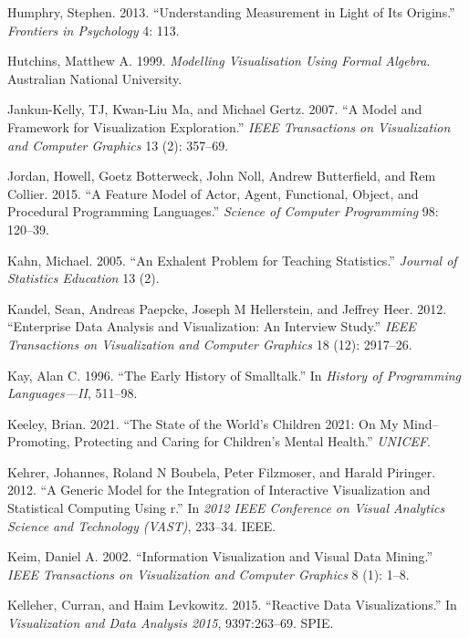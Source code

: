 \documentclass[
]{book}
\newlength{\cslhangindent}
\newenvironment{CSLReferences}[2] %
 {\begin{list}{}{%
  \setlength{\itemindent}{0pt}
  \setlength{\leftmargin}{0pt}
  \setlength{\parsep}{0pt}
  \ifodd #1
   \setlength{\leftmargin}{\cslhangindent}
   \setlength{\itemindent}{-1\cslhangindent}
  \fi
  \setlength{\itemsep}{#2\baselineskip}}}
 {\end{list}}
\theoremstyle{definition}
\theoremstyle{definition}
\theoremstyle{definition}
\theoremstyle{definition}
\theoremstyle{remark}
\begin{document}
\begin{CSLReferences}{1}{0}
Humphry, Stephen. 2013. {``Understanding Measurement in Light of Its Origins.''} \emph{Frontiers in Psychology} 4: 113.

Hutchins, Matthew A. 1999. \emph{Modelling Visualisation Using Formal Algebra}. Australian National University.

Jankun-Kelly, TJ, Kwan-Liu Ma, and Michael Gertz. 2007. {``A Model and Framework for Visualization Exploration.''} \emph{IEEE Transactions on Visualization and Computer Graphics} 13 (2): 357--69.

Jordan, Howell, Goetz Botterweck, John Noll, Andrew Butterfield, and Rem Collier. 2015. {``A Feature Model of Actor, Agent, Functional, Object, and Procedural Programming Languages.''} \emph{Science of Computer Programming} 98: 120--39.

Kahn, Michael. 2005. {``An Exhalent Problem for Teaching Statistics.''} \emph{Journal of Statistics Education} 13 (2).

Kandel, Sean, Andreas Paepcke, Joseph M Hellerstein, and Jeffrey Heer. 2012. {``Enterprise Data Analysis and Visualization: An Interview Study.''} \emph{IEEE Transactions on Visualization and Computer Graphics} 18 (12): 2917--26.

Kay, Alan C. 1996. {``The Early History of Smalltalk.''} In \emph{History of Programming Languages---II}, 511--98.

Keeley, Brian. 2021. {``The State of the World's Children 2021: On My Mind--Promoting, Protecting and Caring for Children's Mental Health.''} \emph{UNICEF}.

Kehrer, Johannes, Roland N Boubela, Peter Filzmoser, and Harald Piringer. 2012. {``A Generic Model for the Integration of Interactive Visualization and Statistical Computing Using r.''} In \emph{2012 IEEE Conference on Visual Analytics Science and Technology (VAST)}, 233--34. IEEE.

Keim, Daniel A. 2002. {``Information Visualization and Visual Data Mining.''} \emph{IEEE Transactions on Visualization and Computer Graphics} 8 (1): 1--8.

Kelleher, Curran, and Haim Levkowitz. 2015. {``Reactive Data Visualizations.''} In \emph{Visualization and Data Analysis 2015}, 9397:263--69. SPIE.


\end{CSLReferences}
\end{document}
